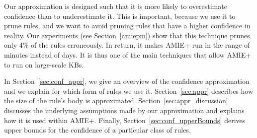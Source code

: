 Our approximation is designed such that it is more likely to overestimate confidence than to underestimate it.
This is important, because we use it to prune rules, and we want to avoid pruning rules that have a higher confidence in reality.
Our experiments (see Section~\ref{amiepm}) show that this technique prunes only 4\% of the rules erroneously. In return, it makes AMIE+ run in the range of minutes instead of days. It is thus one of the main techniques that allow AMIE+ to run on large-scale KBs.

In Section~\ref{sec:conf_appr}, we give an overview of the confidence approximation and we explain for which form of rules we use it. 
Section~\ref{sec:appr} describes how the size of the rule's body is approximated.
Section~\ref{sec:appr_discussion} discusses the underlying assumptions made by our approximation and explains how it is used within AMIE+. 
Finally, Section~\ref{sec:conf_upperBounds} derives upper bounds for the confidence of a particular class of rules.




